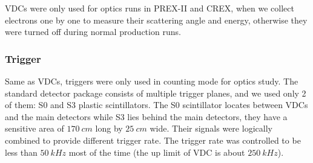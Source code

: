 VDCs were only used for optics runs in PREX-II and CREX, when we collect electrons
one by one to measure their scattering angle and energy, otherwise they were
turned off during normal production runs.



\subsubsection{Trigger}
Same as VDCs, triggers were only used in counting mode for optics study. The standard
detector package consists of multiple trigger planes, and we used only 2 of them:
S0 and S3 plastic scintillators. The S0 scintillator locates between VDCs and the main
detectors while S3 lies behind the main detectors, they have a sensitive area
of $170\ cm$ long by $25\ cm$ wide. Their signals were logically combined to 
provide different trigger rate. The trigger rate was controlled to be less
than $50\ kHz$ most of the time (the up limit of VDC is about $250\ kHz$).
